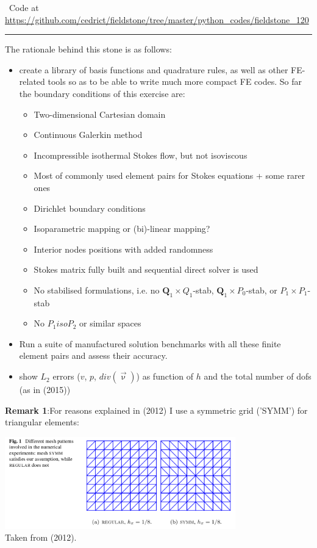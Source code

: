 %

\begin{center}
\inpython~Code at \url{https://github.com/cedrict/fieldstone/tree/master/python_codes/fieldstone_120}
\end{center}

\par\noindent\rule{\textwidth}{0.4pt}


The rationale behind this stone is as follows:
\begin{itemize}
\item create a library of basis functions and quadrature rules, as well as 
other FE-related tools so as to be able to write much more compact FE codes. 
So far the boundary conditions of this exercise are:
\begin{itemize}
\item Two-dimensional Cartesian domain
\item Continuous Galerkin method
\item Incompressible isothermal Stokes flow, but not isoviscous
\item Most of commonly used element pairs for Stokes equations + some rarer ones 
\item Dirichlet boundary conditions 
\item Isoparametric mapping or (bi)-linear mapping? 
\item Interior nodes positions with added randomness
\item Stokes matrix fully built and sequential direct solver is used
\item No stabilised formulations, i.e. no ${\bm Q}_1\times Q_1$-stab, ${\bm Q}_1\times P_0$-stab, or 
      $P_1\times P_1$-stab
\item No $P_1isoP_2$ or similar spaces
\end{itemize}
\item Run a suite of manufactured solution benchmarks with all 
these finite element pairs and assess their accuracy.
\item show $L_2$ errors ($v$, $p$, $div(\vec\upnu)$) as function of $h$ and the 
total number of dofs (as in \textcite{cakp15} (2015))
\end{itemize}


{\bf Remark 1}:For reasons explained in \textcite{bocg12} (2012) I use 
a symmetric grid ('SYMM') for triangular elements:
\begin{center} 
\includegraphics[width=10cm]{python_codes/fieldstone_120/images/bocg12}\\
{\captionfont Taken from \textcite{bocg12} (2012).}
\end{center} 


